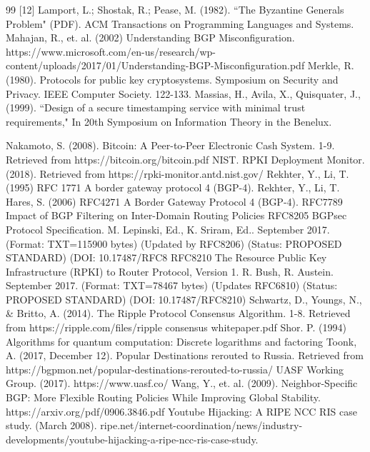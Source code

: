 \documentclass[letterpaper, 10 pt, conference]{ieeeconf}  %
\begin{document}
\begin{thebibliography}{99}
[12] Lamport, L.; Shostak, R.; Pease, M. (1982). ``The Byzantine Generals Problem" (PDF). ACM Transactions on Programming Languages and Systems.
 Mahajan, R., et. al. (2002) Understanding BGP Misconfiguration. https://www.microsoft.com/en-us/research/wp-content/uploads/2017/01/Understanding-BGP-Misconfiguration.pdf
 Merkle, R. (1980). Protocols for public key cryptosystems. Symposium on Security and Privacy. IEEE Computer Society. 122-133.
 Massias, H., Avila, X., Quisquater, J., (1999). ``Design of a secure timestamping service with minimal trust requirements," In 20th Symposium on Information Theory in the Benelux.

 Nakamoto, S. (2008). Bitcoin: A Peer-to-Peer Electronic Cash System.
1-9. Retrieved from https://bitcoin.org/bitcoin.pdf
 NIST. RPKI Deployment Monitor. (2018). Retrieved from https://rpki-monitor.antd.nist.gov/
 Rekhter, Y., Li, T. (1995) RFC 1771 A border gateway protocol 4 (BGP-4).
 Rekhter, Y., Li, T.  Hares, S. (2006) RFC4271 A Border Gateway Protocol 4 (BGP-4).
 RFC7789 Impact of BGP Filtering on Inter-Domain Routing Policies
 RFC8205 BGPsec Protocol Specification. M. Lepinski, Ed., K. Sriram, Ed..
     September 2017. (Format: TXT=115900 bytes) (Updated by RFC8206)
     (Status: PROPOSED STANDARD) (DOI: 10.17487/RFC8
 RFC8210 The Resource Public Key Infrastructure (RPKI) to Router Protocol,
     Version 1. R. Bush, R. Austein. September 2017. (Format: TXT=78467
     bytes) (Updates RFC6810) (Status: PROPOSED STANDARD) (DOI:
     10.17487/RFC8210)
 Schwartz, D., Youngs, N., \& Britto, A. (2014). The
Ripple Protocol Consensus Algorithm. 1-8. Retrieved from
https://ripple.com/files/ripple consensus whitepaper.pdf
 Shor. P. (1994) Algorithms for quantum computation: Discrete logarithms and factoring
 Toonk, A. (2017, December 12). Popular Destinations rerouted to Russia. Retrieved from https://bgpmon.net/popular-destinations-rerouted-to-russia/
 UASF Working Group. (2017). https://www.uasf.co/
 Wang, Y., et. al. (2009). Neighbor-Specific BGP: More Flexible Routing Policies While Improving Global Stability. https://arxiv.org/pdf/0906.3846.pdf
 Youtube Hijacking: A RIPE NCC RIS case study. (March 2008). ripe.net/internet-coordination/news/industry-developments/youtube-hijacking-a-ripe-ncc-ris-case-study.
\end{thebibliography}
\end{document}
